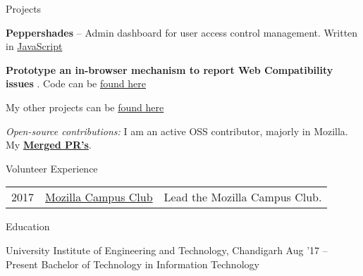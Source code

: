 \documentclass{resume} %
\begin{document}
\begin{rSection}{Projects}
  \begin{rProjectSection}
    \item \textbf {Peppershades} -- Admin dashboard for user access control management. Written in \href{https://github.com/soniasingla/peppershades}{JavaScript}
    \item \textbf {Prototype an in-browser mechanism to report Web Compatibility issues} . Code can be \href{https://github.com/soniasingla/webcompataddon}{found here}
    \item My other projects can be \href{hhttps://soniasingla.com/#projects/}{found here}
  \end{rProjectSection}

  \begin{rBlurbSection}
    \item {\em Open-source contributions:}
      I am an active OSS contributor, majorly in Mozilla. My \href{https://bugzilla.mozilla.org/user_profile?user_id=632911}{\textbf{Merged PR's}}.
  \end{rBlurbSection}
\end{rSection}


\begin{rSection}{Volunteer Experience}
  \begin{tabular}{rll}
2017	     & {\href{https://github.com/moz-niec/}{Mozilla Campus Club}}  & Lead the Mozilla Campus Club.\\
\end{tabular}
\end{rSection}


\begin{rSection}{Education}
  \begin{rEducationSection}{University Institute of Engineering and Technology, Chandigarh}
                           {Aug '17 -- Present}
                           {Bachelor of Technology in Information Technology}
  \end{rEducationSection}
\end{rSection}
\end{document}
